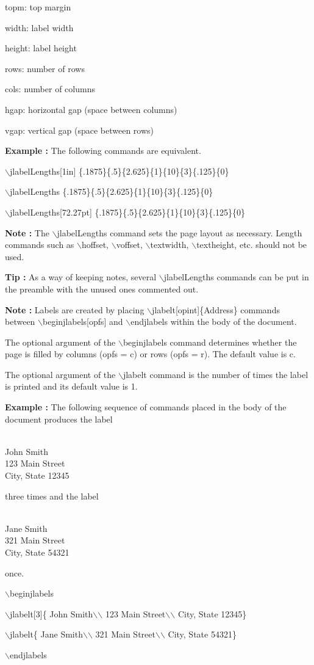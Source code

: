 \documentclass[12pt]{amsart}
\newcounter{Object}
\newcounter{SubObject}
\def\ex{\addtocounter{Object}{1}%
         {\bf Example \theObject:}
         \setcounter{SubObject}{0}}
\def\exlabeljane{%
{ }
\parbox{87pt}{\text{ }\\
Jane Smith\\
321 Main Street\\
City, State  54321}
{ }}
\def\exlabeljohn{%
{ }
\parbox{87pt}{\text{ }\\
John Smith\\
123 Main Street\\
City, State 12345}
{ }}
\def\janecode{%
Jane Smith\(\backslash\)\(\backslash\)%
321 Main Street\(\backslash\)\(\backslash\)%
City, State 54321}
\def\johncode{%
John Smith\(\backslash\)\(\backslash\)%
123 Main Street\(\backslash\)\(\backslash\)%
City, State 12345}
\def\note{\addtocounter{Object}{1}%
         {\bf Note \theObject:}
         \setcounter{SubObject}{0}}
\def\tip{\addtocounter{Object}{1}%
         {\bf Tip \theObject:}
         \setcounter{SubObject}{0}}
\begin{document}
topm: top margin

width: label width

height: label height

rows: number of rows

cols: number of columns

hgap: horizontal gap (space between columns)

vgap: vertical gap (space between rows)

\ex
The following commands are equivalent.

\(\backslash\)jlabelLengths[1in]%
\{.1875\}\{.5\}\{2.625\}\{1\}\{10\}\{3\}\{.125\}\{0\}

\(\backslash\)jlabelLengths%
\{.1875\}\{.5\}\{2.625\}\{1\}\{10\}\{3\}\{.125\}\{0\}

\(\backslash\)jlabelLengths[72.27pt]%
\{.1875\}\{.5\}\{2.625\}\{1\}\{10\}\{3\}\{.125\}\{0\}

\note
The
\(\backslash\)jlabelLengths
command
sets the page layout as necessary.
Length commands
such as
\(\backslash\)hoffset,
\(\backslash\)voffset,
\(\backslash\)textwidth,
\(\backslash\)textheight,
etc.
should not be used.

\tip
As a way of keeping notes,
several \(\backslash\)jlabelLengths
commands can be put in the preamble with
the unused ones commented out.

\note
Labels are created by placing
\(\backslash\)jlabelt[opint]\{Address\}
commands
between\linebreak
\(\backslash\)beginjlabels[opfs]
and
\(\backslash\)endjlabels
within the body of the document.

The optional argument of the
\(\backslash\)beginjlabels
command determines whether the page is filled by
columns (opfs = c) or rows (opfs = r).
The default value is c.

The optional argument
of the \(\backslash\)jlabelt command
is the number of times the label is printed
and its default value is 1.

\ex
The following sequence of commands placed in the body
of the document
produces the label
\exlabeljohn
three times and the label
\exlabeljane
once. 

\enlargethispage{\baselineskip}

\(\backslash\)beginjlabels

\(\backslash\)jlabelt[3]\{\johncode\}

\(\backslash\)jlabelt\{\janecode\}

\(\backslash\)endjlabels
\end{document}
